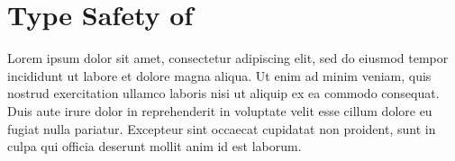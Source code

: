 \chapter{Type Safety of \Surface}
\label{ch:type-safety}



Lorem ipsum dolor sit amet, consectetur adipiscing elit, sed do eiusmod tempor incididunt ut labore et dolore magna aliqua. Ut enim ad minim veniam, quis nostrud exercitation ullamco laboris nisi ut aliquip ex ea commodo consequat. Duis aute irure dolor in reprehenderit in voluptate velit esse cillum dolore eu fugiat nulla pariatur. Excepteur sint occaecat cupidatat non proident, sunt in culpa qui officia deserunt mollit anim id est laborum.
